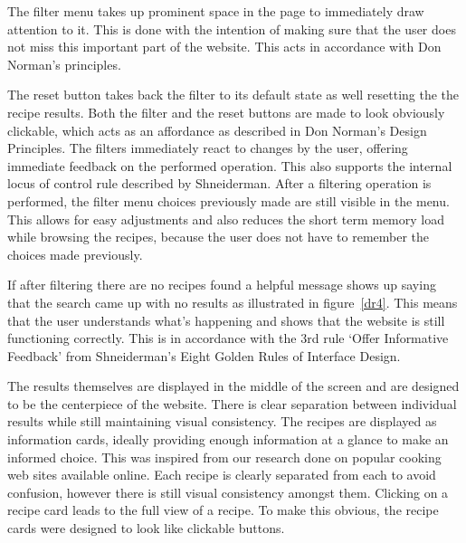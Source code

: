 The filter menu takes up prominent space in the page to immediately draw attention to it. This is done with the intention of making sure that the user does not miss this important part of the website. This acts in accordance with Don Norman’s principles.

The reset button takes back the filter to its default state as well resetting the the recipe results. Both the filter and the reset buttons are made to look obviously clickable, which acts as an affordance as described in Don Norman’s Design Principles. The filters immediately react to changes by the user, offering immediate feedback on the performed operation. This also supports the internal locus of control rule described by Shneiderman. After a filtering operation is performed, the filter menu choices previously made are still visible in the menu. This allows for easy adjustments and also reduces the short term memory load while browsing the recipes, because the user does not have to remember the choices made previously.

If after filtering there are no recipes found a helpful message shows up saying that the search came up with no results as illustrated in figure~\ref{dr4}. This means that the user understands what’s happening and shows that the website is still functioning correctly. This is in accordance with the 3rd rule ‘Offer Informative Feedback’ from  Shneiderman’s Eight Golden Rules of Interface Design. 

The results themselves are displayed in the middle of the screen and are designed to be the centerpiece of the website. There is clear separation between individual results while still maintaining visual consistency. The recipes are displayed as information cards, ideally providing enough information at a glance to make an informed choice. This was inspired from our research done on popular cooking web sites available online. Each recipe is clearly separated from each to avoid confusion, however there is still visual consistency amongst them. Clicking on a recipe card leads to the full view of a recipe. To make this obvious, the recipe cards were designed to look like clickable buttons.
